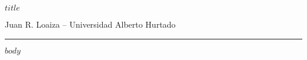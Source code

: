 \documentclass{article}
\begin{document}
{\LARGE $title$}

Juan R. Loaiza -- Universidad Alberto Hurtado

\vspace{0.8em}
\hrule
\vspace{1em}

$body$
\end{document}
